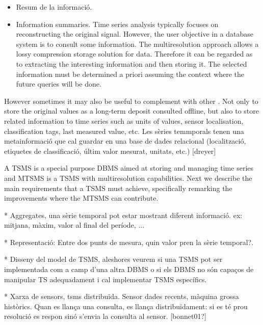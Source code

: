 \begin{itemize}
\item Resum de la informació. 



\todo{}

\item Information summaries. Time series analysis typically focuses on
  reconstructing the original signal. However, the user objective in a
  database system is to consult some information. The multiresolution
  approach allows a lossy compression storage solution for data. Therefore
  it can be regarded as to extracting the interesting information and
  then storing it. The selected information must be determined a
  priori assuming the context where the future queries will be done.
\end{itemize}


However sometimes it may also be useful to complement 
with other . Not only to store the original values as a
long-term deposit consulted offline, but also to store related
information to time series such as units of values, sensor
localisation, classification tags, last measured value, etc.
Les sèries temmporals tenen una metainformació que cal guardar en una base de dades relacional (localització, etiquetes de classificació, últim valor mesurat, unitats, etc.) [dreyer]




A TSMS is a special purpose DBMS aimed at storing and managing time
series and MTSMS is a TSMS with multiresolution capabilities. Next we
describe the main requirements that a TSMS must achieve, specifically
remarking the improvements where the MTSMS can contribute.





* Aggregates, una sèrie temporal pot estar mostrant diferent informació. ex: mitjana, màxim, valor al final del període, ...






* Representació: Entre dos punts de mesura, quin valor pren la sèrie temporal?.


* Disseny del model de TSMS, aleshores veurem si una TSMS pot ser implementada com a camp d'una altra DBMS o si els DBMS no són capaços de manipular TS adequadament i cal implementar TSMS específics.

* Xarxa de sensors, tsms distribuïda. Sensor dades recents, màquina grossa històrics. Quan es llança una consulta, es llança distribuïdament: si es té prou resolució es respon sinó s'envia la consulta al sensor. [bonnet01?]

